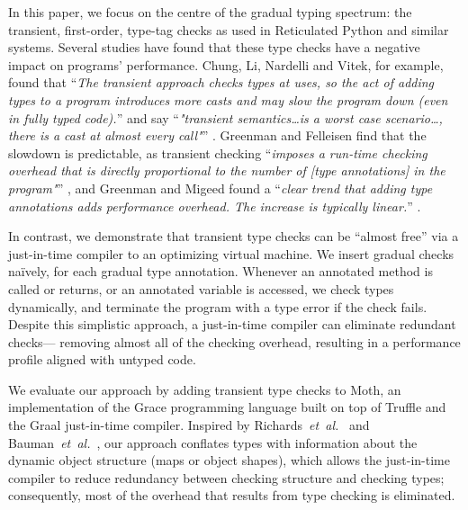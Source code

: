In this paper, we focus on the centre of the gradual typing
spectrum: the transient, first-order, type-tag checks as used in
Reticulated Python and similar systems. 
Several studies have found
that these type checks have a negative impact on programs'
performance.
Chung, Li, Nardelli and Vitek, for example, found that 
``\textit{The transient approach checks types at uses, so the act of
  adding types to a program introduces more casts and may slow the
  program down (even in fully typed code).}'' and say 
``\textit{"transient semantics\ldots is a worst case scenario\ldots,
  there is a cast at almost every call"}'' \cite{kafka18}.
Greenman and Felleisen find that the slowdown is predictable, as
transient checking ``\textit{imposes a run-time checking overhead that
  is directly proportional to the number of [type annotations] in
  the program"}'' \cite{bensurvey18icfp}, and 
Greenman and Migeed found a ``\textit{clear trend
that adding type annotations adds performance overhead. The increase
is typically linear.}'' \cite{Greenman2018}.  


In contrast, we demonstrate that
transient type checks can be ``almost
free'' via a just-in-time compiler to an
optimizing virtual machine.
We insert 
gradual checks
na\"ively, for each gradual type 
annotation.
Whenever an annotated method is called or
returns, or
an annotated variable is accessed,
we check types dynamically, and
terminate the program with a type error if the check fails.
Despite this simplistic approach, a just-in-time compiler can
eliminate redundant checks---%
removing almost all of the checking overhead,
resulting in a performance profile aligned with untyped code.

We evaluate our approach by adding transient type checks to Moth,
an implementation of the Grace programming language
built on top of Truffle
and the Graal just-in-time compiler\citep{Wurthinger2013,Wurthinger:2017:PPE}.
Inspired by Richards~\textit{et~al.}~\cite{Richards2017} and
Bauman~\textit{et~al.}~\cite{Bauman2017},
our approach conflates types
with information about the dynamic object structure 
(maps\citep{Self} or object shapes\citep{woss2014object}), 
which allows the just-in-time compiler
to reduce redundancy between checking structure
and checking types; consequently, most of the overhead
that results from type checking is eliminated.


